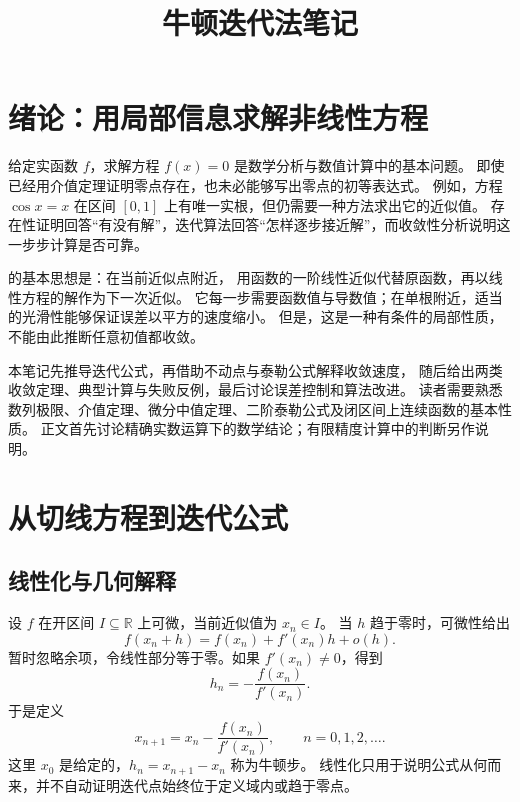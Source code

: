 \documentclass{ctexart}
\title{牛顿迭代法笔记}
\author{}
\date{}
\begin{document}
\maketitle
\tableofcontents

\section{绪论：用局部信息求解非线性方程}
\label{sec:newton-introduction}

给定实函数 $f$，求解方程 $f(x)=0$ 是数学分析与数值计算中的基本问题。
即使已经用介值定理证明零点存在，也未必能够写出零点的初等表达式。
例如，方程 $\cos x=x$ 在区间 $[0,1]$ 上有唯一实根，但仍需要一种方法求出它的近似值。
存在性证明回答“有没有解”，迭代算法回答“怎样逐步接近解”，而收敛性分析说明这一步步计算是否可靠。

的基本思想是：在当前近似点附近，
用函数的一阶线性近似代替原函数，再以线性方程的解作为下一次近似。
它每一步需要函数值与导数值；在单根附近，适当的光滑性能够保证误差以平方的速度缩小。
但是，这是一种有条件的局部性质，不能由此推断任意初值都收敛。

本笔记先推导迭代公式，再借助不动点与泰勒公式解释收敛速度，
随后给出两类收敛定理、典型计算与失败反例，最后讨论误差控制和算法改进。
读者需要熟悉数列极限、介值定理、微分中值定理、二阶泰勒公式及闭区间上连续函数的基本性质。
正文首先讨论精确实数运算下的数学结论；有限精度计算中的判断另作说明。

\section{从切线方程到迭代公式}
\label{sec:newton-construction}

\subsection{线性化与几何解释}

设 $f$ 在开区间 $I\subseteq\mathbb R$ 上可微，当前近似值为 $x_n\in I$。
当 $h$ 趋于零时，可微性给出
\[
  f(x_n+h)=f(x_n)+f'(x_n)h+o(h).
\]
暂时忽略余项，令线性部分等于零。如果 $f'(x_n)\ne0$，得到
\[
  h_n=-\frac{f(x_n)}{f'(x_n)}.
\]
于是定义
\begin{equation}\label{eq:newton-iteration}
  x_{n+1}=x_n-\frac{f(x_n)}{f'(x_n)},\qquad n=0,1,2,\ldots.
\end{equation}
这里 $x_0$ 是给定的，$h_n=x_{n+1}-x_n$ 称为牛顿步。
线性化只用于说明公式从何而来，并不自动证明迭代点始终位于定义域内或趋于零点。
\end{document}
